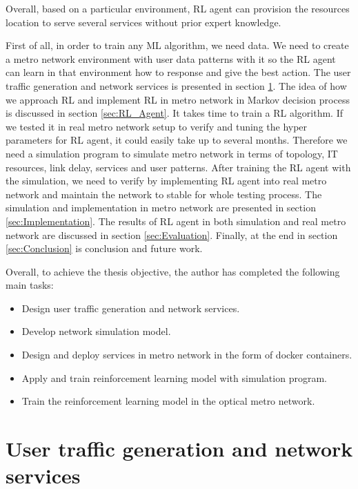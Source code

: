 \documentclass[conference]{IEEEtran}
\begin{document}
Overall, based on a particular environment, RL agent can provision the resources location to serve several services without prior expert knowledge.  

First of all, in order to train any ML algorithm, we need data. We need to create a metro network environment with user data patterns with it so the RL agent can learn in that environment how to response and give the best action. The user traffic generation and network services is presented in section \ref{sec:User traffic generation}. The idea of how we approach RL and implement RL in metro network in Markov decision process is discussed in section \ref{sec:RL_Agent}. It takes time to train a RL algorithm. If we tested it in real metro network setup to verify and tuning the hyper parameters for RL agent, it could easily take up to several months. Therefore we need a simulation program to simulate metro network in terms of topology, IT resources, link delay, services and user patterns. After training the RL agent with the simulation, we need to verify by implementing RL agent into real metro network and maintain the network to stable for whole testing process. The simulation and implementation in metro network are presented in section \ref{sec:Implementation}. The results of RL agent in both simulation and real metro network are discussed in section \ref{sec:Evaluation}. Finally, at the end in section \ref{sec:Conclusion} is conclusion and future work. 

Overall, to achieve the thesis objective, the author has completed the following main tasks:
\begin{itemize}
    \item Design user traffic generation and network services.
    \item Develop network simulation model.
    \item Design and deploy services in metro network in the form of docker containers.
    \item Apply and train reinforcement learning model with simulation program.
    \item Train the reinforcement learning model in the optical metro network.
\end{itemize}


\section{User traffic generation and network services}
\label{sec:User traffic generation}
\end{document}
